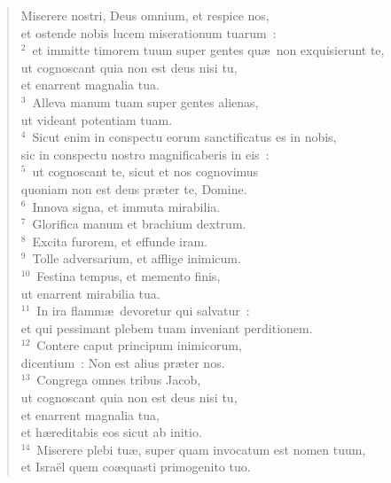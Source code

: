 \begin{flushleft}\begin{verse}\vspace{-19pt}\hspace{6pt}Miserere nostri, Deus omnium, et respice nos,\\\hspace{6pt} et ostende nobis lucem miserationum tuarum~:\\
${}^{2}$~et immitte timorem tuum super gentes qu\ae\ non exquisierunt te,\\ ut cognoscant quia non est deus nisi tu,\\ et enarrent magnalia tua.\\
${}^{3}$~Alleva manum tuam super gentes alienas,\\ ut videant potentiam tuam.\\
${}^{4}$~Sicut enim in conspectu eorum sanctificatus es in nobis,\\ sic in conspectu nostro magnificaberis in eis~:\\
${}^{5}$~ut cognoscant te, sicut et nos cognovimus\\ quoniam non est deus pr\ae ter te, Domine.\\
${}^{6}$~Innova signa, et immuta mirabilia.\\
${}^{7}$~Glorifica manum et brachium dextrum.\\
${}^{8}$~Excita furorem, et effunde iram.\\
${}^{9}$~Tolle adversarium, et afflige inimicum.\\
${}^{10}$~Festina tempus, et memento finis,\\ ut enarrent mirabilia tua.\\
${}^{11}$~In ira flamm\ae\ devoretur qui salvatur~:\\ et qui pessimant plebem tuam inveniant perditionem.\\
${}^{12}$~Contere caput principum inimicorum,\\ dicentium~: Non est alius pr\ae ter nos.\\
${}^{13}$~Congrega omnes tribus Jacob,\\ ut cognoscant quia non est deus nisi tu,\\ et enarrent magnalia tua,\\ et h\ae reditabis eos sicut ab initio.\\
${}^{14}$~Miserere plebi tu\ae , super quam invocatum est nomen tuum,\\ et Isra\"el quem co\ae quasti primogenito tuo.\\

\end{verse}
\end{flushleft}

